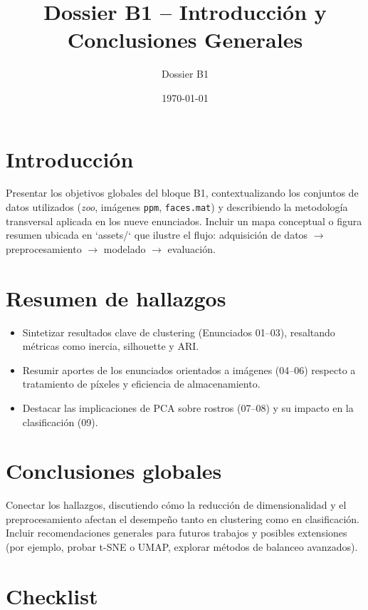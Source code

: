 \documentclass[12pt]{article}
\title{Dossier B1 -- Introducción y Conclusiones Generales}
\author{Dossier B1}
\date{\today}
\begin{document}
\maketitle
\section{Introducción}
Presentar los objetivos globales del bloque B1, contextualizando los conjuntos de datos utilizados (\emph{zoo}, imágenes \texttt{ppm}, \texttt{faces.mat}) y describiendo la metodología transversal aplicada en los nueve enunciados. Incluir un mapa conceptual o figura resumen ubicada en `assets/` que ilustre el flujo: adquisición de datos $\rightarrow$ preprocesamiento $\rightarrow$ modelado $\rightarrow$ evaluación.

\section{Resumen de hallazgos}
\begin{itemize}
  \item Sintetizar resultados clave de clustering (Enunciados 01--03), resaltando métricas como inercia, silhouette y ARI.
  \item Resumir aportes de los enunciados orientados a imágenes (04--06) respecto a tratamiento de píxeles y eficiencia de almacenamiento.
  \item Destacar las implicaciones de PCA sobre rostros (07--08) y su impacto en la clasificación (09).
\end{itemize}

\section{Conclusiones globales}
Conectar los hallazgos, discutiendo cómo la reducción de dimensionalidad y el preprocesamiento afectan el desempeño tanto en clustering como en clasificación. Incluir recomendaciones generales para futuros trabajos y posibles extensiones (por ejemplo, probar t-SNE o UMAP, explorar métodos de balanceo avanzados).

\section*{Checklist}
\ChecklistBase
\end{document}

